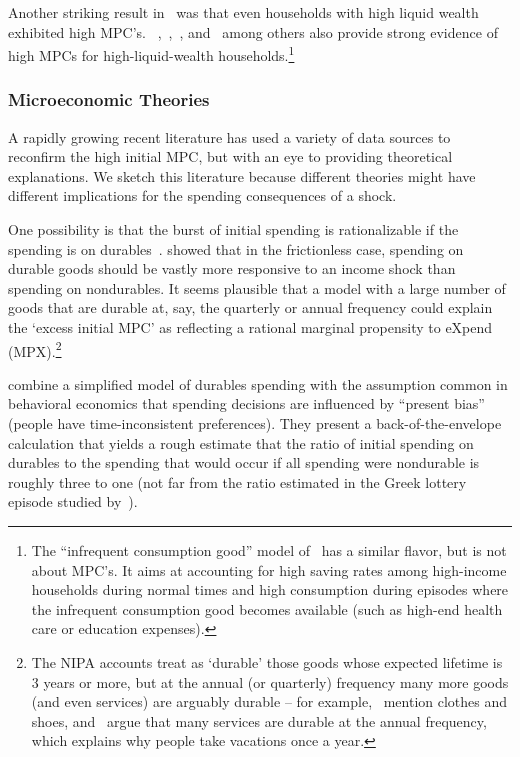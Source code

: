 \documentclass[qe]{econsocart}
\begin{document}
Another striking result in~\cite{fagereng-mpc-2021} was that even households with high liquid wealth exhibited high MPC's. ~\cite{boehm2025fivefacts},~\cite{graham2024mental},~\cite{crawley2023MicroMacro}, and~\cite{kueng2018excess} among others also provide strong evidence of high MPCs for high-liquid-wealth households.\footnote{The ``infrequent consumption good'' model of~\cite{melcangiStock} has a similar flavor, but is not about MPC's.  It aims at accounting for high saving rates among high-income households during normal times and high consumption during episodes where the infrequent consumption good becomes available (such as high-end health care or education expenses).}

\label{microeconomic-theories}
\subsubsection{Microeconomic Theories}
A rapidly growing recent literature has used a variety of data sources to reconfirm the high initial MPC, but with an eye to providing theoretical explanations. We sketch this literature because different theories might have different implications for the spending consequences of a shock.

One possibility is that the burst of initial spending is rationalizable if the spending is on durables~\citep{bcShocksStocks}.
\cite{mankiwDurgoods} showed that in the frictionless case, spending on durable goods should be vastly more responsive to an income shock than spending on nondurables.
It seems plausible that a model with a large number of goods that are durable at, say, the quarterly or annual frequency could explain the `excess initial MPC' as reflecting a rational marginal propensity to eXpend (MPX).\footnote{The NIPA accounts treat as `durable' those goods whose expected lifetime is 3 years or more, but at the annual (or quarterly) frequency many more goods (and even services) are arguably durable -- for example,~\cite{bdTimeSeriesC} mention clothes and shoes, and~\cite{hkpMemorable} argue that many services are durable at the annual frequency, which explains why people take vacations once a year.}

\cite{lmmPresentBias} combine a simplified model of durables spending with the assumption common in behavioral economics that spending decisions are influenced by ``present bias'' (people have time-inconsistent preferences).  They present a back-of-the-envelope calculation that yields a rough estimate that the ratio of initial spending on durables to the spending that would occur if all spending were nondurable is roughly three to one (not far from the ratio estimated in the Greek lottery episode studied by~\cite{kotsogiannisMPCs}).
\end{document}
